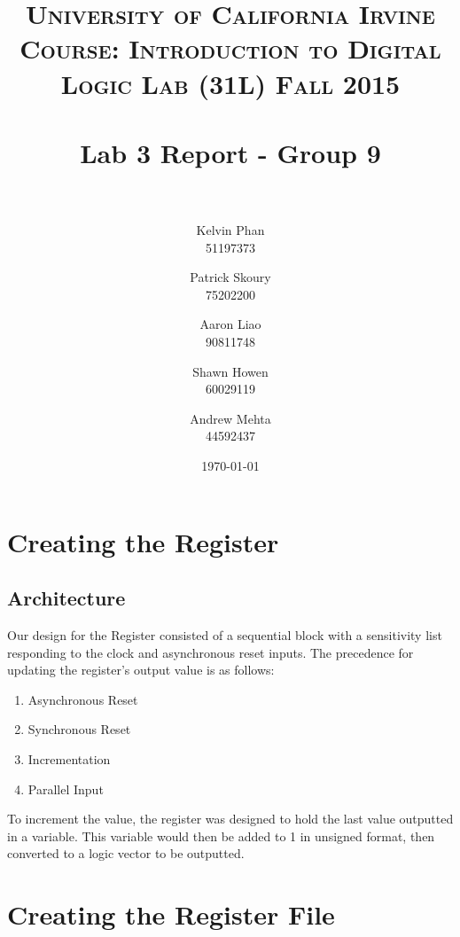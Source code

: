 \documentclass[paper=letter, fontsize=11pt]{scrartcl}
\title{	
\normalfont \normalsize 
\textsc{University of California Irvine} \\  %
\textsc{Course: Introduction to Digital Logic Lab (31L) Fall 2015} \\ [25pt]
\horrule{0.5pt} \\[0.4cm] %
\huge Lab 3 Report - Group 9\\ %
\horrule{2pt} \\[0.5cm] %
}
\author{Kelvin Phan \\ 51197373
	\and
	Patrick Skoury \\ 75202200
	\and
	Aaron Liao \\ 90811748
	\and
	Shawn Howen \\ 60029119
	\and
	Andrew Mehta \\ 44592437
}
\date{\large\today} %
\numberwithin{equation}{section} %
\numberwithin{figure}{section} %
\numberwithin{table}{section} %
\begin{document}
\maketitle %


\section{Creating the Register}

\subsection{Architecture}
\begin{flushleft}
	Our design for the Register consisted of a sequential block with a sensitivity list responding to the clock and asynchronous reset inputs. The precedence for updating the register's output value is as follows:
	\begin{enumerate}
		\item Asynchronous Reset
		\item Synchronous Reset
		\item Incrementation
		\item Parallel Input
	\end{enumerate}
	To increment the value, the register was designed to hold the last value outputted in a variable. This variable would then be added to 1 in unsigned format, then converted to a logic vector to be outputted. \\[20pt]
\end{flushleft}


\section{Creating the Register File}
\end{document}
